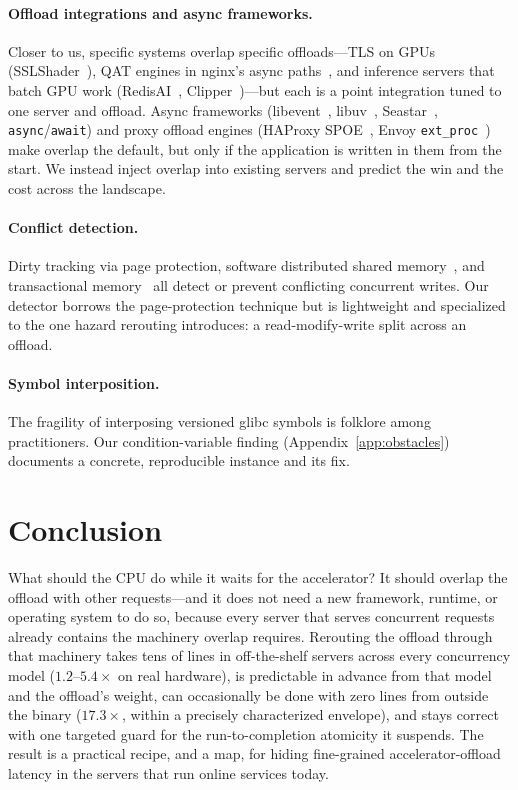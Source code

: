 \paragraph{Offload integrations and async frameworks.}
Closer to us, specific systems overlap specific offloads---TLS on GPUs (SSLShader~\citep{sslshader}),
QAT engines in nginx's async paths~\citep{qat}, and inference servers that batch GPU work
(RedisAI~\citep{redisai}, Clipper~\citep{clipper})---but each is a point integration tuned to one
server and offload. Async frameworks (libevent~\citep{libevent}, libuv~\citep{libuv},
Seastar~\citep{seastar}, \texttt{async}/\texttt{await}) and proxy offload engines (HAProxy
SPOE~\citep{spoe}, Envoy \texttt{ext\_proc}~\citep{extproc}) make overlap the default, but only if
the application is written in them from the start. We instead inject overlap into existing servers
and predict the win and the cost across the landscape.

\paragraph{Conflict detection.}
Dirty tracking via page protection, software distributed shared memory~\citep{treadmarks}, and
transactional memory~\citep{htm} all detect or prevent conflicting concurrent writes. Our detector
borrows the page-protection technique but is lightweight and specialized to the one hazard
rerouting introduces: a read-modify-write split across an offload.

\paragraph{Symbol interposition.}
The fragility of interposing versioned glibc symbols is folklore among practitioners. Our
condition-variable finding (Appendix~\ref{app:obstacles}) documents a concrete, reproducible
instance and its fix.


\section{Conclusion}
\label{sec:conclusion}

What should the CPU do while it waits for the accelerator? It should overlap the offload with
other requests---and it does not need a new framework, runtime, or operating system to do so,
because every server that serves concurrent requests already contains the machinery overlap
requires. Rerouting the offload through that machinery takes tens of lines in off-the-shelf
servers across every concurrency model ($1.2$--$5.4\times$ on real hardware), is predictable in
advance from that model and the offload's weight, can occasionally be done
with zero lines from outside the binary ($17.3\times$, within a precisely characterized envelope),
and stays correct with one targeted guard for the run-to-completion atomicity it suspends. The
result is a practical recipe, and a map, for hiding fine-grained accelerator-offload latency in
the servers that run online services today.


